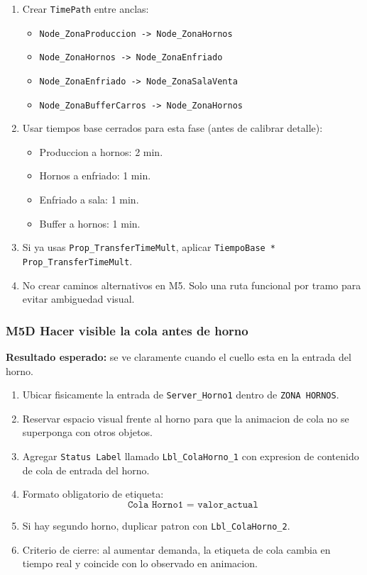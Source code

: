 \documentclass[11pt]{article}
\newcommand{\simio}[1]{\texttt{#1}}
\newcommand{\state}[1]{\texttt{#1}}
\begin{document}
\begin{enumerate}
  \item Crear \simio{TimePath} entre anclas:
  \begin{itemize}
    \item \simio{Node\_ZonaProduccion -> Node\_ZonaHornos}
    \item \simio{Node\_ZonaHornos -> Node\_ZonaEnfriado}
    \item \simio{Node\_ZonaEnfriado -> Node\_ZonaSalaVenta}
    \item \simio{Node\_ZonaBufferCarros -> Node\_ZonaHornos}
  \end{itemize}
  \item Usar tiempos base cerrados para esta fase (antes de calibrar detalle):
  \begin{itemize}
    \item Produccion a hornos: 2 min.
    \item Hornos a enfriado: 1 min.
    \item Enfriado a sala: 1 min.
    \item Buffer a hornos: 1 min.
  \end{itemize}
  \item Si ya usas \state{Prop\_TransferTimeMult}, aplicar \simio{TiempoBase * Prop\_TransferTimeMult}.
  \item No crear caminos alternativos en M5. Solo una ruta funcional por tramo para evitar ambiguedad visual.
\end{enumerate}

\subsubsection{M5D Hacer visible la cola antes de horno}
\textbf{Resultado esperado:} se ve claramente cuando el cuello esta en la entrada del horno.

\begin{enumerate}
  \item Ubicar fisicamente la entrada de \simio{Server\_Horno1} dentro de \simio{ZONA HORNOS}.
  \item Reservar espacio visual frente al horno para que la animacion de cola no se superponga con otros objetos.
  \item Agregar \simio{Status Label} llamado \simio{Lbl\_ColaHorno\_1} con expresion de contenido de cola de entrada del horno.
  \item Formato obligatorio de etiqueta:
  \[
  \texttt{Cola Horno1 = valor\_actual}
  \]
  \item Si hay segundo horno, duplicar patron con \simio{Lbl\_ColaHorno\_2}.
  \item Criterio de cierre: al aumentar demanda, la etiqueta de cola cambia en tiempo real y coincide con lo observado en animacion.
\end{enumerate}
\end{document}
